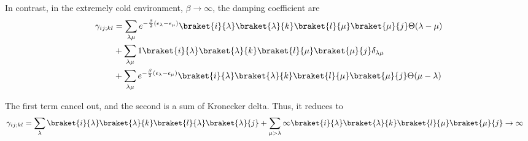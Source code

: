 In contrast, in the extremely cold environment, $\beta \rightarrow \infty$, the damping coefficient are
\begin{equation}
    \begin{split}
        \gamma_{ij;kl}&= \sum_{\lambda\mu}e^{-\frac{\beta}{2}\left(\epsilon_\lambda - \epsilon_\mu\right)}\braket{i}{\lambda}\braket{\lambda}{k}\braket{l}{\mu}\braket{\mu}{j}\Theta(\lambda-\mu)\\
        & + \sum_{\lambda\mu} 1\braket{i}{\lambda}\braket{\lambda}{k}\braket{l}{\mu}\braket{\mu}{j}\delta_{\lambda\mu}\\
        & + \sum_{\lambda\mu} e^{-\frac{\beta}{2}\left(\epsilon_\lambda - \epsilon_\mu\right)}\braket{i}{\lambda}\braket{\lambda}{k}\braket{l}{\mu}\braket{\mu}{j}\Theta(\mu-\lambda)
    \end{split}
\end{equation}

The first term cancel out,  and the second is a sum of Kronecker delta. Thus, it reduces to
\begin{equation}
    \begin{split}
        \gamma_{ij;kl}&= \sum_{\lambda}\braket{i}{\lambda}\braket{\lambda}{k}\braket{l}{\lambda}\braket{\lambda}{j}+ \sum_{\mu>\lambda}\infty\braket{i}{\lambda}\braket{\lambda}{k}\braket{l}{\mu}\braket{\mu}{j} \rightarrow \infty
    \end{split}
\end{equation}

